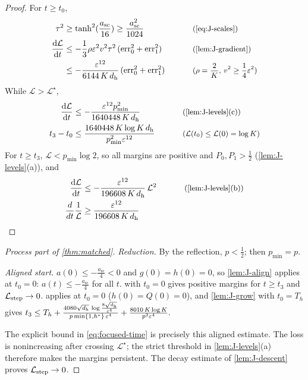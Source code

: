 \begin{proof}
For $t\ge t_0$,
\begin{alignat*}{2}
 \tau^2&\ge\tanh^2(\tfrac{a_{\mathrm{sc}}}{16})\ge\frac{a_{\mathrm{sc}}^2}{1024} &\qquad& \why{\cref{eq:J-scales}}\\
 \ddt{\mathcal L}&\le-\tfrac{1}{3}\rho\initscale^2v^2\tau^2\,(\mathrm{err}_0^2+\mathrm{err}_1^2) && \why{\cref{lem:J-gradient}}\\
 &\le-\frac{\initscale^{12}}{6144\,K\,d_{\mathrm h}}\,(\mathrm{err}_0^2+\mathrm{err}_1^2) && \why{$\rho=\tfrac{2}{K}$, $v^2\ge\tfrac{1}{4}\initscale^2$}
\end{alignat*}
While $\mathcal L>\mathcal L^\star$,
\begin{alignat*}{2}
 \ddt{\mathcal L}&\le-\frac{\initscale^{12}p_{\min}^2}{1640448\,K\,d_{\mathrm h}} &\qquad& \why{\cref{lem:J-levels}(c)}\\
 t_3-t_0&\le\frac{1640448\,K\log K\,d_{\mathrm h}}{p_{\min}^2\initscale^{12}} && \why{$\mathcal L(t_0)\le\mathcal L(0)=\log K$}
\end{alignat*}
For $t\ge t_3$, $\mathcal L<p_{\min}\log2$, so all margins are positive and $P_0,P_1>\frac{1}{2}$ (\cref{lem:J-levels}(a)), and
\begin{alignat*}{2}
 \ddt{\mathcal L}&\le-\frac{\initscale^{12}}{196608\,K\,d_{\mathrm h}}\,\mathcal L^2 &\qquad& \why{\cref{lem:J-levels}(b)}\\
 \frac{d}{dt}\frac{1}{\mathcal L}&\ge\frac{\initscale^{12}}{196608\,K\,d_{\mathrm h}} && \qedhere
\end{alignat*}
\end{proof}

\begin{proof}[Process part of \cref{thm:matched}]
\emph{Reduction.} By the reflection, $p<\frac{1}{2}$; then $p_{\min}=p$.

\emph{Aligned start.} $a(0)\le-\frac{a_{\mathrm{sc}}}{4}<0$ and $g(0)=h(0)=0$, so \cref{lem:J-align} applies at $t_0=0$: $a(t)\le-\frac{a_{\mathrm{sc}}}{4}$ for all $t$.
 with $t_0=0$ gives positive margins for $t\ge t_3$ and $\mathcal L_{\mathrm{step}}\to0$.  applies at $t_0=0$ ($h(0)=Q(0)=0$), and
\cref{lem:J-grow} with $t_0=T_h$ gives
 $t_3\le T_h+\frac{4080\sqrt{d_{\mathrm h}}\,\log\frac{8\sqrt{d_{\mathrm h}}}{\varepsilon^4}}{p\min\{1,h^\star\}\,\varepsilon^4}+\frac{8010\,K\log K}{p^2\varepsilon^4} .$ 


The explicit bound in \cref{eq:focused-time} is precisely this aligned estimate.
The loss is nonincreasing after crossing $\mathcal L^\star$; the strict threshold
in \cref{lem:J-levels}(a) therefore makes the margins persistent. The decay
estimate of \cref{lem:J-descent} proves $\mathcal L_{\mathrm{step}}\to0$.
\end{proof}
